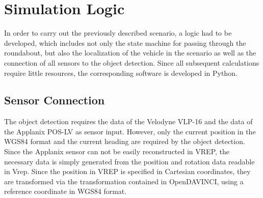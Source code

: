 \documentclass[11pt,oneside,openright]{mpreport}
\begin{document}
\section{Simulation Logic}


In order to carry out the previously described scenario, a logic had to be developed, which includes not only the state machine for passing through the roundabout,
but also the localization of the vehicle in the scenario as well as the connection of all sensors to the object detection.
Since all subsequent calculations require little resources, the corresponding software is developed in Python.

\subsection{Sensor Connection}
The object detection requires the data of the Velodyne VLP-16 and the data of the Applanix POS-LV as sensor input.
However, only the current position in the WGS84 format and the current heading are required by the object detection.
Since the Applanix sensor can not be easily reconstructed in VREP, the necessary data is simply generated from the position and rotation data readable in Vrep.
Since the position in VREP is specified in Cartesian coordinates, they are transformed via the transformation contained in OpenDAVINCI, using a reference coordinate in WGS84 format.
\end{document}
